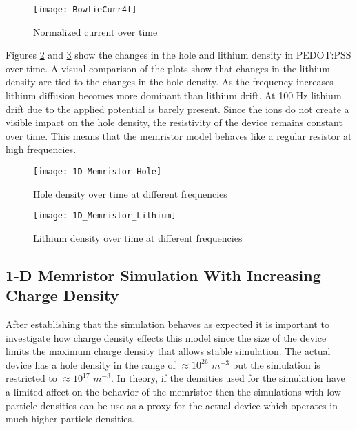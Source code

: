 \begin{doublespace}
\begin{figure}[!htp]
\centering
\texttt{[image: BowtieCurr4f]}
\caption{Normalized current over time} 
\label{BowtieCurr}
\end{figure}

Figures \ref{Bowhole} and \ref{Bowli} show the changes in the hole and lithium density in PEDOT:PSS over time. A visual comparison of the plots show that changes in the lithium density are tied to the changes in the hole density. As the frequency increases lithium diffusion becomes more dominant than lithium drift. At 100 Hz lithium drift due to the applied potential is barely present. Since the ions do not create a visible impact on the hole density, the resistivity of the device remains constant over time. This means that the memristor model behaves like a regular resistor at high frequencies.


\begin{figure}[!htp]
\centering
\texttt{[image: 1D\_Memristor\_Hole]}
\caption{Hole density over time at different frequencies} 
\label{Bowhole}
\end{figure}

\begin{figure}[!htp]
\centering
\texttt{[image: 1D\_Memristor\_Lithium]}
\caption{Lithium density over time at different frequencies} 
\label{Bowli}
\end{figure}


\clearpage
\subsection{1-D Memristor Simulation With Increasing Charge Density}

After establishing that the simulation behaves as expected it is important to investigate how charge density effects this model since the size of the device limits the maximum charge density that allows stable simulation. The actual device has a hole density in the range of $ \approx 10^{26}$ $m^{-3}$ but the simulation is restricted to $\approx 10^{17}$ $m^{-3}$. In theory, if the densities used for the simulation  have a limited affect on the behavior of the memristor then the simulations with low particle densities can be use as a proxy for the actual device which operates in much higher particle densities.


\end{doublespace}
